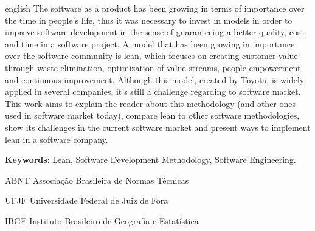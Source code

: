  
\begin{resumo}[ABSTRACT]
 \begin{otherlanguage*}{english}
 The software as a product has been growing in terms of importance over the time in people’s life, thus it was necessary to invest in models in order to improve software development in the sense of guaranteeing a better quality, cost and time in  a software project. A model that has been growing in importance over the software community is lean, which focuses on creating customer value through waste elimination, optimization of value streams, people empowerment and continuous improvement. Although this model, created by Toyota, is widely applied in several companies, it’s still a challenge regarding to software market. This work aims to explain the reader about this methodology (and other ones used in software market today), compare lean to other software methodologies, show its challenges in the current software market and present ways to implement lean in a software company.

\textbf{Keywords}: Lean, Software Development Methodology, Software Engineering.
 \end{otherlanguage*}
\end{resumo}


\listoffigures*
\cleardoublepage



\begin{siglas} %
  \item[ABNT] Associa\c{c}\~ao Brasileira de Normas T\'ecnicas
  \item[UFJF] Universidade Federal de Juiz de Fora
  \item[IBGE] Instituto Brasileiro de Geografia e Estat\'istica
\end{siglas}


 
\tableofcontents*
\cleardoublepage


